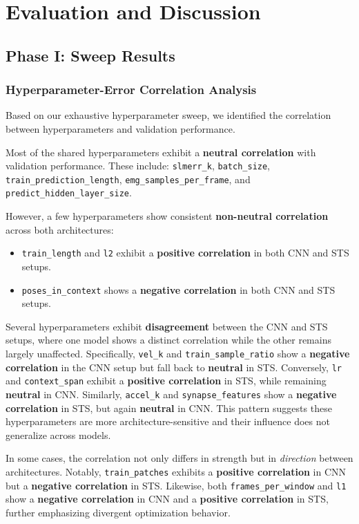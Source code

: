 \chapter{Evaluation and Discussion}
\label{chap:eval}

\section{Phase I: Sweep Results}

\subsection{Hyperparameter-Error Correlation Analysis}
Based on our exhaustive hyperparameter sweep, we identified the correlation between hyperparameters and validation performance.

Most of the shared hyperparameters exhibit a \textbf{neutral correlation} with validation performance. These include: 
\texttt{slmerr\_k}, \texttt{batch\_size}, \texttt{train\_prediction\_length}, \texttt{emg\_samples\_per\_frame}, and \texttt{predict\_hidden\_layer\_size}.

However, a few hyperparameters show consistent \textbf{non-neutral correlation} across both architectures:
\begin{itemize}
    \item \texttt{train\_length} and \texttt{l2} exhibit a \textbf{positive correlation} in both CNN and STS setups.
    \item \texttt{poses\_in\_context} shows a \textbf{negative correlation} in both CNN and STS setups.
\end{itemize}

Several hyperparameters exhibit \textbf{disagreement} between the CNN and STS setups, where one model shows a distinct correlation while the other remains largely unaffected. Specifically, 
\texttt{vel\_k} and \texttt{train\_sample\_ratio} show a \textbf{negative correlation} in the CNN setup but fall back to \textbf{neutral} in STS. 
Conversely, \texttt{lr} and \texttt{context\_span} exhibit a \textbf{positive correlation} in STS, while remaining \textbf{neutral} in CNN. 
Similarly, \texttt{accel\_k} and \texttt{synapse\_features} show a \textbf{negative correlation} in STS, but again \textbf{neutral} in CNN. 
This pattern suggests these hyperparameters are more architecture-sensitive and their influence does not generalize across models.

In some cases, the correlation not only differs in strength but in \textit{direction} between architectures. 
Notably, \texttt{train\_patches} exhibits a \textbf{positive correlation} in CNN but a \textbf{negative correlation} in STS. 
Likewise, both \texttt{frames\_per\_window} and \texttt{l1} show a \textbf{negative correlation} in CNN and a \textbf{positive correlation} in STS, further emphasizing divergent optimization behavior.

